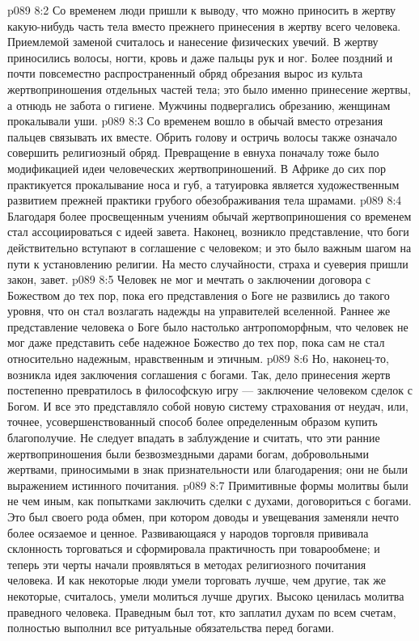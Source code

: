 \vs p089 8:2 Со временем люди пришли к выводу, что можно приносить в жертву какую\hyp{}нибудь часть тела вместо прежнего принесения в жертву всего человека. Приемлемой заменой считалось и нанесение физических увечий. В жертву приносились волосы, ногти, кровь и даже пальцы рук и ног. Более поздний и почти повсеместно распространенный обряд обрезания вырос из культа жертвоприношения отдельных частей тела; это было именно принесение жертвы, а отнюдь не забота о гигиене. Мужчины подвергались обрезанию, женщинам прокалывали уши.
\vs p089 8:3 Со временем вошло в обычай вместо отрезания пальцев связывать их вместе. Обрить голову и остричь волосы также означало совершить религиозный обряд. Превращение в евнуха поначалу тоже было модификацией идеи человеческих жертвоприношений. В Африке до сих пор практикуется прокалывание носа и губ, а татуировка является художественным развитием прежней практики грубого обезображивания тела шрамами.
\vs p089 8:4 \pc Благодаря более просвещенным учениям обычай жертвоприношения со временем стал ассоциироваться с идеей завета. Наконец, возникло представление, что боги действительно вступают в соглашение с человеком; и это было важным шагом на пути к установлению религии. На место случайности, страха и суеверия пришли закон, завет.
\vs p089 8:5 Человек не мог и мечтать о заключении договора с Божеством до тех пор, пока его представления о Боге не развились до такого уровня, что он стал возлагать надежды на управителей вселенной. Раннее же представление человека о Боге было настолько антропоморфным, что человек не мог даже представить себе надежное Божество до тех пор, пока сам не стал относительно надежным, нравственным и этичным.
\vs p089 8:6 Но, наконец\hyp{}то, возникла идея заключения соглашения с богами.  Так, дело принесения жертв постепенно превратилось в философскую игру --- заключение человеком сделок с Богом. И все это представляло собой новую систему страхования от неудач, или, точнее, усовершенствованный способ более определенным образом купить благополучие. Не следует впадать в заблуждение и считать, что эти ранние жертвоприношения были безвозмездными дарами богам, добровольными жертвами, приносимыми в знак признательности или благодарения; они не были выражением истинного почитания.
\vs p089 8:7 \pc Примитивные формы молитвы были не чем иным, как попытками заключить сделки с духами, договориться с богами. Это был своего рода обмен, при котором доводы и увещевания заменяли нечто более осязаемое и ценное. Развивающаяся у народов торговля прививала склонность торговаться и сформировала практичность при товарообмене; и теперь эти черты начали проявляться в методах религиозного почитания человека. И как некоторые люди умели торговать лучше, чем другие, так же некоторые, считалось, умели молиться лучше других. Высоко ценилась молитва праведного человека. Праведным был тот, кто заплатил духам по всем счетам, полностью выполнил все ритуальные обязательства перед богами.
